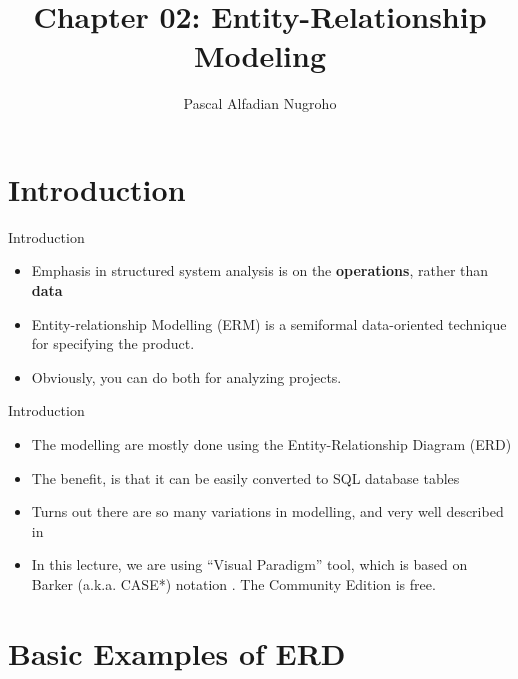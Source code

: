 \documentclass{beamer}
\title{Chapter 02: Entity-Relationship Modeling}
\author[P.A. Nugroho]{Pascal Alfadian Nugroho}
\institute[IF-UNPAR]{Program Studi Informatika, \\Universitas Katolik Parahyangan}
\begin{document}
	\begin{frame}
		\titlepage
	\end{frame}

	\section{Introduction}
	\begin{frame}{Introduction}
		\begin{itemize}
			\item Emphasis in structured system analysis is on the \textbf{operations}, rather than \textbf{data}
            \item Entity-relationship Modelling (ERM) is a semiformal data-oriented technique for specifying the product.
            \item Obviously, you can do both for analyzing projects.
		\end{itemize}
	\end{frame}
	\begin{frame}{Introduction}
		\begin{itemize}
			\item The modelling are mostly done using the Entity-Relationship Diagram (ERD)
			\item The benefit, is that it can be easily converted to SQL database tables
            \item Turns out there are so many variations in modelling, and very well described in \cite{song1995}
            \item In this lecture, we are using ``Visual Paradigm'' tool, which is based on Barker (a.k.a. CASE*) notation \cite{barker1992case}. The Community Edition is free.
		\end{itemize}
	\end{frame}
	
	\section{Basic Examples of ERD}
\end{document}
